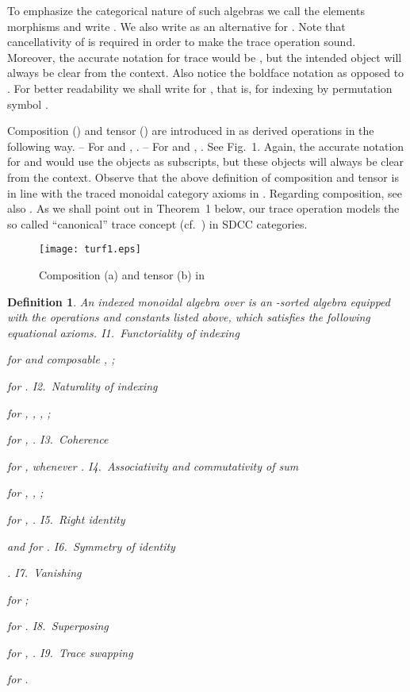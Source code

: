 \documentclass{eptcs}
\newtheorem{definition}{Definition}
\begin{document}
To emphasize the categorical nature of such algebras we call the elements 
morphisms and write . We also write  as an alternative
for .   
Note that cancellativity of  is required in order to make the trace operation sound.
Moreover, the accurate notation for trace would be , but the intended object 
 will always be clear from the context.
Also notice the boldface notation  as opposed to .
For better readability we shall write  for , that is, for indexing
 by permutation symbol .

Composition () and tensor () are introduced in 
as derived operations in the following way.      
\vsp\newline
  -- For  and , . 
\newline
  -- For  and , .
\vsp\newline
See Fig.\ 1. Again, the accurate notation for  and  would use the 
objects  as subscripts, but these objects will always be clear 
from the context. Observe that the above definition of composition and tensor
is in line with the traced monoidal category axioms in \cite{tra,concur}. 
Regarding composition, see also \cite[Identity ]{acta}. As we shall point out
in Theorem~1 below, our trace operation models the so called 
``canonical'' trace concept (cf.\ \cite{tra}) in SDCC categories. 
\begin{figure}[h]
\begin{center}
\texttt{[image: turf1.eps]}
\end{center}
\vspmm
\caption{Composition (a) and tensor (b) in }
\vspmmm \vspmini
\end{figure}
\begin{definition}
{\em An {\em indexed monoidal algebra\/} over  is an -sorted algebra  equipped with the operations and constants listed above,
which satisfies the following equational axioms.
\vsp\newline
  I1.\ {\em Functoriality of indexing}

    for  and
   composable , ;

    for .
\newline
 I2.\ {\em Naturality of indexing}

   
    for , , , ;

   
    for , .
\newline
I3.\ {\em Coherence}

     for , whenever .
\newline
 I4.\ {\em Associativity and commutativity of sum}

     for , , ;

     for , .
\newline
 I5.\ {\em Right identity}

     and  for .
\newline
 I6.\ {\em Symmetry of identity}

    .
\newline
 I7.\ {\em Vanishing} 

     for ;

    
     for .
\newline
 I8.\ {\em Superposing}

     for , .
\newline
 I9.\ {\em Trace swapping}

    
    for .
}
\end{definition}
\end{document}
